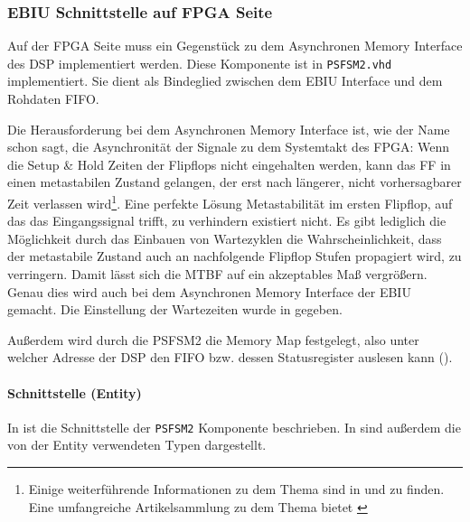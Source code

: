 \subsubsection{EBIU Schnittstelle auf FPGA Seite}
\label{implEBIUFPGA}

Auf der FPGA Seite muss ein Gegenstück zu dem Asynchronen Memory Interface des DSP implementiert werden. Diese Komponente ist in \lstinline$PSFSM2.vhd$ implementiert. Sie dient als Bindeglied zwischen dem EBIU Interface und dem Rohdaten FIFO.

Die Herausforderung bei dem Asynchronen Memory Interface ist, wie der Name schon sagt, die Asynchronität der Signale zu dem Systemtakt des FPGA: Wenn die Setup \& Hold Zeiten der Flipflops nicht eingehalten werden, kann das FF in einen metastabilen Zustand gelangen, der erst nach längerer, nicht vorhersagbarer Zeit verlassen wird\footnote{Einige weiterführende Informationen zu dem Thema sind in \cite{FPGAFAQMetastability} und \cite{ginosar2011metastability} zu finden. Eine umfangreiche Artikelsammlung zu dem Thema bietet \cite{MetastabilityBibliography}}. 
Eine perfekte Lösung Metastabilität im ersten Flipflop, auf das das Eingangssignal trifft, zu verhindern existiert nicht. Es gibt lediglich die Möglichkeit durch das Einbauen von Wartezyklen die Wahrscheinlichkeit, dass der metastabile Zustand auch an nachfolgende Flipflop Stufen propagiert wird, zu verringern. Damit lässt sich die \gls{MTBF} auf ein akzeptables Maß vergrößern. Genau dies wird auch bei dem Asynchronen Memory Interface der EBIU gemacht. Die Einstellung der Wartezeiten wurde in  gegeben.

Außerdem wird durch die PSFSM2 die Memory Map festgelegt, also unter welcher Adresse der DSP den FIFO bzw. dessen Statusregister auslesen kann ().

\paragraph{Schnittstelle (Entity)}
In  ist die Schnittstelle der \lstinline$PSFSM2$ Komponente beschrieben. In  sind außerdem die von der Entity verwendeten Typen dargestellt.

